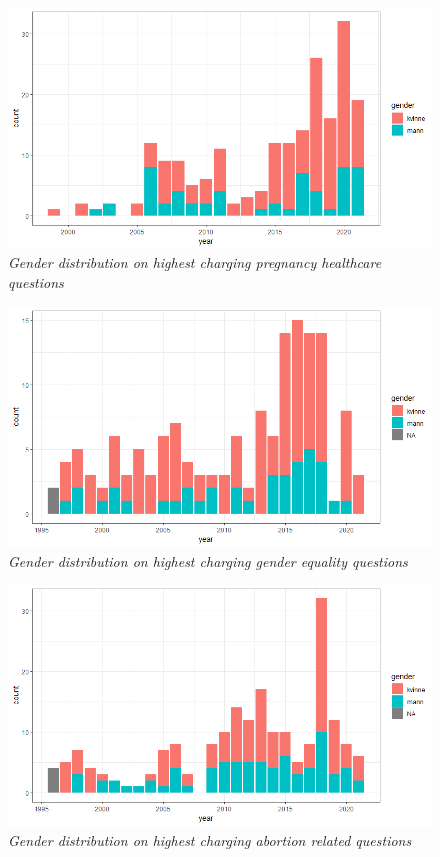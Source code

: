 \documentclass[12pt]{article}
\begin{document}
	\begin{figure}[h!]
		\centering
		\includegraphics[scale=0.60]{Img/119dist.png}
		\caption{\textit{Gender distribution on highest charging pregnancy healthcare questions}}
	\end{figure}
	\begin{figure}[h!]
		\centering
		\includegraphics[scale=0.60]{Img/135dist.png}
		\caption{\textit{Gender distribution on highest charging gender equality questions}}
	\end{figure}
	\begin{figure}[h!]
		\centering
		\includegraphics[scale=0.60]{Img/164dist.png}
		\caption{\textit{Gender distribution on highest charging abortion related questions}}
	\end{figure}
	
\end{document}
